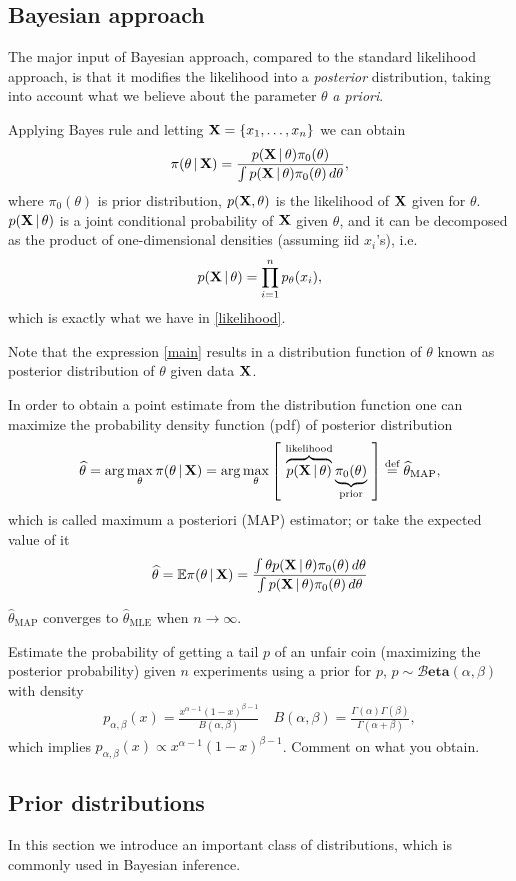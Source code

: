 \subsection{Bayesian approach}
The major input of Bayesian approach, compared to the standard likelihood approach, is that it modifies the likelihood into a {\it{posterior}} distribution, taking into account what we believe about the parameter $\theta$ {\it{a priori}}. 
\par Applying Bayes rule and letting $\mathbf{X} = \{ x_1, \dots, x_n \}$ we can obtain
\begin{align}\label{main}
\pi(\theta \, | \, \mathbf{X}) = \frac {p(\mathbf{X} \, | \, \theta) \pi_0(\theta)}{\int p(\mathbf{X} \, | \, \theta) \pi_0(\theta) \, d\theta},
\end{align}
where $\pi_0(\theta)$ is prior distribution, $p(\mathbf{X}, \theta)$ is the likelihood of $\mathbf{X}$ given for $\theta$. $p(\mathbf{X} \, | \, \theta)$ is a joint conditional probability of $\mathbf{X}$ given $\theta$, and it can be decomposed as the product of one-dimensional densities (assuming iid $x_i$'s), i.e. 
\begin{align}
    p(\mathbf{X} \, | \, \theta) = \prod_{i=1}^n p_{\theta}(x_i),
\end{align}
which is exactly what we have in \eqref{likelihood}.
\par Note that the expression \eqref{main} results in a distribution function of $\theta$ known as posterior distribution of $\theta$ given data $\mathbf{X}$. 
\par In order to obtain a point estimate from the distribution function one can maximize the probability density function (pdf) of posterior distribution
\begin{align}
    \widehat{\theta} = \arg \max_{\theta} \pi(\theta \, | \, \mathbf{X}) = \arg\max_{\theta} \left[\,\, \overbrace{p(\mathbf{X} \, | \, \theta)}^{\text{likelihood}} \underbrace{\pi_0(\theta)}_{\text{prior}} \,\, \right] \stackrel{\text{def}}{=} \widehat{\theta}_{\text{MAP}},
\end{align}
which is called maximum a posteriori (MAP) estimator;
or take the expected value of it
\begin{align}
    \widehat{\theta} = \mathbb{E} \pi(\theta \, | \, \mathbf{X}) = \frac{\int \theta p(\mathbf{X} \, | \, \theta) \pi_0(\theta) \, d\theta}{\int p(\mathbf{X} \, | \, \theta) \pi_0(\theta) \, d\theta}
\end{align}
\begin{rmrk}
$\hat{\theta}_{\text{MAP}}$ converges to $\hat{\theta}_{\text{MLE}}$ when $n \to \infty$.
\end{rmrk}
\begin{exer} 
Estimate the probability of getting a tail $p$ of an unfair coin (maximizing the posterior probability) given $n$ experiments using a prior for $p$, $p \sim \mathcal{B}\textbf{eta}(\alpha, \beta)$ with density 
\begin{align}
p_{\alpha, \beta}(x) = \frac{x^{\alpha - 1} (1-x)^{\beta - 1}}{B(\alpha, \beta)} \quad B(\alpha, \beta) = \frac{\Gamma(\alpha)\Gamma(\beta)}{\Gamma(\alpha + \beta)},
\end{align} 
which implies $p_{\alpha, \beta}(x) \propto x^{\alpha - 1} (1-x)^{\beta - 1}$. Comment on what you obtain.
\end{exer}

\subsection{Prior distributions}
In this section we introduce an important class of distributions, which is commonly used in Bayesian inference. 
